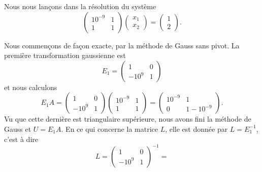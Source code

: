Nous nous lançons dans la résolution du système
\begin{equation}
    \begin{pmatrix}
        10^{-9}    &   1    \\ 
        1    &   1    
    \end{pmatrix}\begin{pmatrix}
        x_1    \\ 
        x_2    
    \end{pmatrix}=\begin{pmatrix}
        1    \\ 
        2    
    \end{pmatrix}.
\end{equation}

\begin{example}     \label{ExooNTECooXvTcoh}
    Nous commençons de façon exacte, par la méthode de Gauss sans pivot. La première transformation gaussienne est
    \begin{equation}
        E_1=\begin{pmatrix}
            1    &   0    \\ 
            -10^9    &   1    
        \end{pmatrix}
    \end{equation}
    et nous calculons
    \begin{equation}
        E_1A=\begin{pmatrix}
            1    &   0    \\ 
            -10^9    &   1    
        \end{pmatrix}\begin{pmatrix}
            10^{-9}    &   1    \\ 
            1    &   1    
        \end{pmatrix}=
        \begin{pmatrix}
            10^{-9}    &   1    \\ 
            0    &   1-10^{-9}    
        \end{pmatrix}.
    \end{equation}
    Vu que cette dernière est triangulaire supérieure, nous avons fini la méthode de Gauss et \( U=E_1A\). En ce qui concerne la matrice \( L\), elle est donnée par \( L=E_1^{-1}\), c'est à dire
    \begin{equation}
        L=\begin{pmatrix}
            1    &   0    \\ 
            -10^9    &   1    
        \end{pmatrix}^{-1}=

\end{equation}
\end{example}
